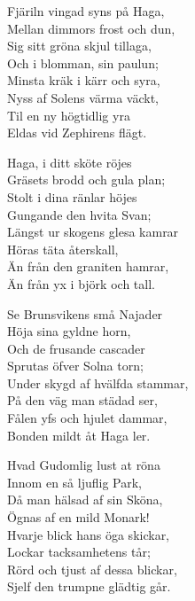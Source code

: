 \vspace{10pt}
Fjäriln vingad syns på Haga,\\
Mellan dimmors frost och dun,\\
Sig sitt gröna skjul tillaga,\\
Och i blomman, sin paulun;\\
Minsta kräk i kärr och syra,\\
Nyss af Solens värma väckt,\\
Til en ny högtidlig yra\\
Eldas vid Zephirens flägt.\par
\vspace{10pt}

Haga, i ditt sköte röjes\\
Gräsets brodd och gula plan;\\
Stolt i dina ränlar höjes\\
Gungande den hvita Svan;\\
Längst ur skogens glesa kamrar\\
Höras täta återskall,\\
Än från den graniten hamrar,\\
Än från yx i björk och tall.\par
\vspace{10pt}

Se Brunsvikens små Najader\\
Höja sina gyldne horn,\\
Och de frusande cascader\\
Sprutas öfver Solna torn;\\
Under skygd af hvälfda stammar,\\
På den väg man städad ser,\\
Fålen yfs och hjulet dammar,\\
Bonden mildt åt Haga ler.\par
\vspace{10pt}

Hvad Gudomlig lust at röna\\
Innom en så ljuflig Park,\\
Då man hälsad af sin Sköna,\\
Ögnas af en mild Monark!\\
Hvarje blick hans öga skickar,\\
Lockar tacksamhetens tår;\\
Rörd och tjust af dessa blickar,\\
Sjelf den trumpne glädtig går.\\
